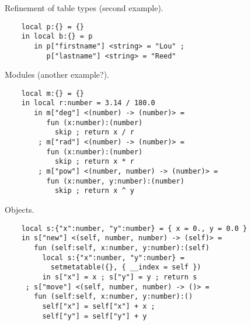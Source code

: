 Refinement of table types (second example).

\begin{verbatim}
    local p:{} = {}
    in local b:{} = p
       in p["firstname"] <string> = "Lou" ;
          p["lastname"] <string> = "Reed"
\end{verbatim}

Modules (another example?).

\begin{verbatim}
    local m:{} = {}
    in local r:number = 3.14 / 180.0
       in m["deg"] <(number) -> (number)> =
          fun (x:number):(number)
            skip ; return x / r
        ; m["rad"] <(number) -> (number)> =
          fun (x:number):(number)
            skip ; return x * r
        ; m["pow"] <(number, number) -> (number)> =
          fun (x:number, y:number):(number)
            skip ; return x ^ y
\end{verbatim}

Objects.

\begin{verbatim}
    local s:{"x":number, "y":number} = { x = 0., y = 0.0 }
    in s["new"] <(self, number, number) -> (self)> =
       fun (self:self, x:number, y:number):(self)
         local s:{"x":number, "y":number} =
           setmetatable({}, { __index = self })
         in s["x"] = x ; s["y"] = y ; return s
     ; s["move"] <(self, number, number) -> ()> =
       fun (self:self, x:number, y:number):()
         self["x"] = self["x"] + x ;
         self["y"] = self["y"] + y 
\end{verbatim}
